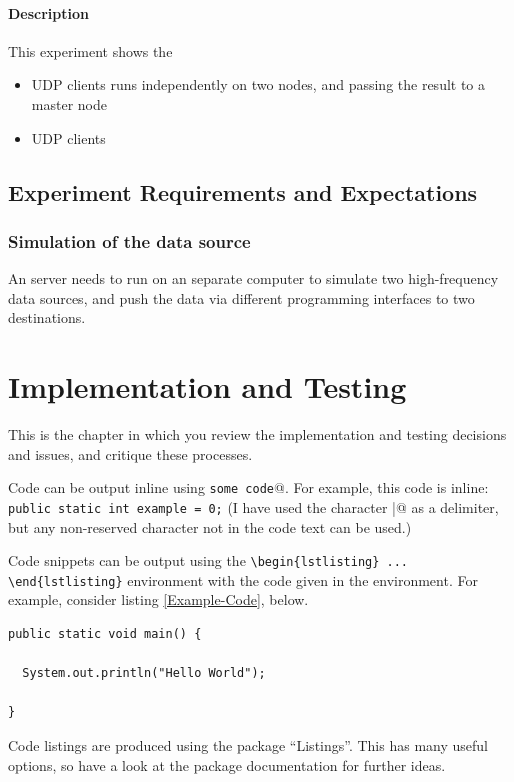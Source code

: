\documentclass[11pt,openright,a4paper]{report}
\begin{document}
\subsubsection{Description}
This experiment shows the 
\begin{itemize}
	\item UDP clients runs independently on two nodes, and passing the result to a master node
	\item UDP clients
\end{itemize}

\section{Experiment Requirements and Expectations}
\subsection{Simulation of the data source}
An server needs to run on an separate computer to simulate two high-frequency data sources, and push the data via different programming interfaces to two destinations.

\chapter{Implementation and Testing}
This is the chapter in which you review the implementation and testing
decisions and issues, and critique these processes.

Code can be output inline using \verb@\lstinline|some code|@.  For example,
this code is inline: \lstinline|public static int example = 0;|  (I have
used the character \verb@|@ as a delimiter, but any non-reserved character
not in the code text can be used.)

Code snippets can be output using the \verb|\begin{lstlisting} ... \end{lstlisting}|
environment with the code given in the environment.  For
example, consider listing \ref{Example-Code}, below.

\begin{lstlisting}[breaklines,breakatwhitespace,caption={Example code},label=Example-Code]
public static void main() {

  System.out.println("Hello World");

}
\end{lstlisting}

Code listings are produced using the package ``Listings''.  This has many
useful options, so have a look at the package documentation for further
ideas.
\end{document}

